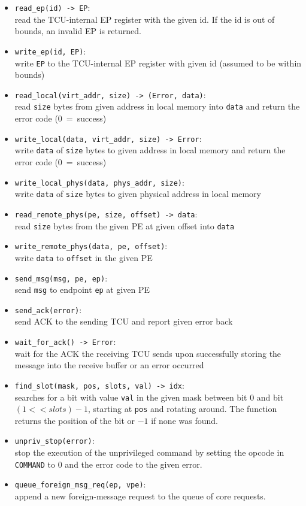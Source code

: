 \begin{itemize}
  \item \texttt{read\_ep(id) -> EP}:\\
  read the TCU-internal EP register with the given id. If the id is out of bounds, an invalid EP is
  returned.
  \item \texttt{write\_ep(id, EP)}:\\
  write \texttt{EP} to the TCU-internal EP register with given id (assumed to be within bounds)
  \item \texttt{read\_local(virt\_addr, size) -> (Error, data)}:\\
  read \texttt{size} bytes from given address in local memory into \texttt{data} and return the error
  code (0~=~success)
  \item \texttt{write\_local(data, virt\_addr, size) -> Error}:\\
  write \texttt{data} of \texttt{size} bytes to given address in local memory and return the error
  code (0~=~success)
  \item \texttt{write\_local\_phys(data, phys\_addr, size)}:\\
  write \texttt{data} of \texttt{size} bytes to given physical address in local memory
  \item \texttt{read\_remote\_phys(pe, size, offset) -> data}:\\
  read \texttt{size} bytes from the given PE at given offset into \texttt{data}
  \item \texttt{write\_remote\_phys(data, pe, offset)}:\\
  write \texttt{data} to \texttt{offset} in the given PE
  \item \texttt{send\_msg(msg, pe, ep)}:\\
  send \texttt{msg} to endpoint \texttt{ep} at given PE
  \item \texttt{send\_ack(error)}:\\
  send ACK to the sending TCU and report given error back
  \item \texttt{wait\_for\_ack() -> Error}:\\
  wait for the ACK the receiving TCU sends upon successfully storing the message into the receive
  buffer or an error occurred
  \item \texttt{find\_slot(mask, pos, slots, val) -> idx}:\\
  searches for a bit with value \texttt{val} in the given mask between bit 0 and bit $(1 << slots) -
  1$, starting at \texttt{pos} and rotating around. The function returns the position of the bit or
  $-1$ if none was found.
  \item \texttt{unpriv\_stop(error)}:\\
  stop the execution of the unprivileged command by setting the opcode in \texttt{COMMAND} to 0 and
  the error code to the given error.
  \item \texttt{queue\_foreign\_msg\_req(ep, vpe)}:\\
  append a new foreign-message request to the queue of core requests. \extend{}
\end{itemize}

